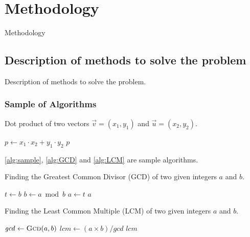 
\chapter{Methodology}\label{ch:4}
\minitoc

Methodology

\newpage

\section{Description of methods to solve the problem}

Description of methods to solve the problem.

\subsection{Sample of Algorithms}

\begin{algorithm}[htbp]
	\caption{Dot product of two vectors $\vec{v}=\left(x_1, y_1\right)$ and $\vec{u}=\left(x_2, y_2\right)$.}
	\begin{algorithmic}[1]
		\State $p \gets x_1\cdot x_2 + y_1\cdot y_2$
		\State \Return $p$ 
		\EndFunction
	\end{algorithmic}
	\label{alg:sample}
\end{algorithm}

\autoref{alg:sample}, \ref{alg:GCD} and \ref{alg:LCM} are sample algorithms.

\begin{algorithm} [htbp]
	\caption{Finding the Greatest Common Divisor (\gls{GCD}) of two given integers $a$ and $b$.}
	\begin{algorithmic}[1]
		\State $t \gets b$
		\State $b \gets a\bmod b$
		\State $a \gets t$
		\EndWhile
		\State \Return $a$
		\EndFunction
	\end{algorithmic}
	\label{alg:GCD}
\end{algorithm}

\begin{algorithm} [htbp]
	\caption{Finding the Least Common Multiple (\gls{LCM}) of two given integers $a$ and $b$.}
	\begin{algorithmic}[1]
		\State $\mathit{gcd} \gets \mbox{\Call{Gcd}{$a,b$}}$ 
		\State $\mathit{lcm} \gets \left(a\times b\right)/\mathit{gcd}$
		\State \Return $\mathit{lcm}$
		\EndFunction
	\end{algorithmic}
	\label{alg:LCM}
\end{algorithm}

